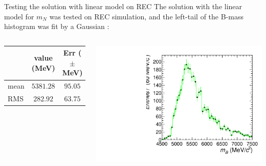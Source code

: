 \documentclass[9pt,usenames,dvipsnames]{beamer}
\begin{document}
\begin{frame}{Testing the solution with linear model on REC}
	The solution with the linear model for $m_N$ was tested on REC simulation, and the left-tail of the B-mass histogram was fit by a Gaussian :
	\begin{columns}[c]
		\begin{table}
			\centering
			\begin{tabular}{l  c c }
				\hline
				& value (MeV) & Err ($\pm$ MeV) \\
				\hline
				mean & $5381.28$  & $95.05$  \\
				RMS & $282.92$ & $63.75$ \\
				\hline
			\end{tabular}
		\end{table}
		\begin{center}
			\includegraphics[width= \textwidth]{./assets/linear_model_reco} 
		\end{center}
	\end{columns}
\end{frame}
\end{document}

